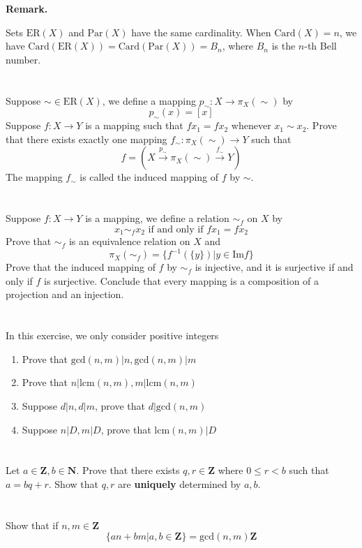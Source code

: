 \documentclass{report}
\begin{document}
\textbf{Remark.} 

Sets $\text{ER}(X)$ and $\text{Par}(X)$ have the same cardinality. When $\text{Card}(X) = n$, we have $\text{Card}(\text{ER}(X))=\text{Card}(\text{Par}(X))=B_n$, where $B_n$ is the $n$-th Bell number.
\section{}
Suppose $\sim \in \text{ER}(X)$, we define a mapping $p_\sim: X \rightarrow \pi_X(\sim)$ by
\[p_\sim (x)= [x]\]
Suppose $f: X \rightarrow Y$ is a mapping such that $fx_1=fx_2$ whenever $x_1\sim x_2$. Prove that there exists exactly one mapping $f_\sim : \pi_X(\sim)\rightarrow Y$ such that
\[f = \left( X \xrightarrow{p_\sim} \pi_X(\sim) \xrightarrow{f_\sim} Y\right)\]
The mapping $f_\sim$ is called the induced mapping of $f$ by $\sim$.
\section{}
Suppose $f:X \rightarrow Y$ is a mapping, we define a relation $\sim_f$ on $X$ by
\[x_1 \sim_f x_2\text{ if and only if }fx_1=fx_2\]
Prove that $\sim_f$ is an equivalence relation on $X$ and 
\[\pi_X({\sim_f})=\{f^{-1}(\{y\})|y \in \text{Im}f\}\]
Prove that the induced mapping of $f$ by $\sim_f$ is injective, and it is surjective if and only if $f$ is surjective. Conclude that every mapping is a composition of a projection and an injection.
\section{}
In this exercise, we only consider positive integers
\begin{enumerate}
\item Prove that $\text{gcd}(n,m)|n,\text{gcd}(n,m)|m$
\item Prove that $n|\text{lcm}(n,m),m|\text{lcm}(n,m)$
\item Suppose $d|n,d|m$, prove that $d|\text{gcd}(n,m)$
\item Suppose $n|D,m|D$, prove that $\text{lcm}(n,m)|D$
\end{enumerate}
\section{}
Let $a \in \mathbf{Z}, b \in \mathbf{N}$. Prove that there exists $q,r \in \mathbf{Z}$ where $0\le r<b$ such that $a = bq+r$. Show that $q,r$ are \textbf{uniquely} determined by $a,b$.
\section{}
Show that if $n,m \in \mathbf{Z}$
\[\{an+bm|a,b \in \mathbf{Z}\} = \text{gcd}(n,m)\mathbf{Z}\]
\end{document}
